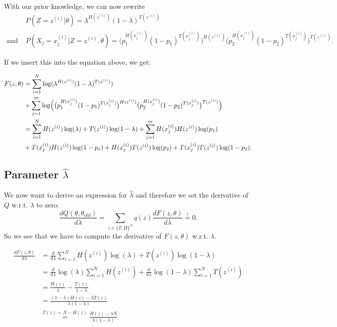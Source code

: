\documentclass[10pt,a4paper]{article}
\begin{document}
With our prior knowledge, we can now rewrite
\begin{align*}
&P(Z=z^{(i)}|\theta)=\lambda^{H(z^{(i)})}(1-\lambda)^{T(z^{(i)})}\\
\text{and } & P(X_j=x_j^{(i)}|Z=z^{(i)},\theta)= \bigl( p_1^{H(x_j^{(i)})} (1-p_1)^{T(x_j^{(i)})}\bigr)^{H(z^{(i)})} \bigl(  p_2^{H(x_j^{(i)})} (1-p_2)^{T(x_j^{(i)})} \bigr)^{T(z^{(i)})}.
\end{align*}

If we insert this into the equation above, we get:

\begin{align*}
F(z,\theta)&=\sum_{i=1}^N \log (\lambda^{H(z^{(i)})}(1-\lambda)^{T(z^{(i)})})\\
& + \sum_{j=1}^m \log \Bigl(\bigl( p_1^{H(x_j^{(i)})} (1-p_1)^{T(x_j^{(i)})}\bigr)^{H(z^{(i)})} \bigl(  p_2^{H(x_j^{(i)})} (1-p_2)^{T(x_j^{(i)})} \bigr)^{T(z^{(i)})} \Bigr)\\
&=\sum_{i=1}^N H(z^{(i)})\log (\lambda)+ T(z^{(i)}) \log (1-\lambda) +\sum_{j=1}^m  H(x_j^{(i)}) H(z^{(i)}) \log(p_1)\\
& + T(x_j^{(i)}) H(z^{(i)})\log(1-p_1) + H(x_j^{(i)})T(z^{(i)}) \log(p_2)+ T(x_j^{(i)})T(z^{(i)}) \log (1-p_2).
\end{align*}

\subsection*{Parameter $\hat \lambda$}
We now want to derive an expression for $\hat \lambda$ and therefore we set the derivative of $Q$ w.r.t. $\lambda$ to zero:
\begin{equation}\label{derQlambda}
\frac{dQ(\theta,\theta_{old})}{d\lambda}=\sum_{z\in \{T,H\}^N} q(z) \frac{dF(z,\theta)}{d\lambda} \stackrel{!}{=}0.
\end{equation}
So we see that we have to compute the derivative of $F(z,\theta)$ w.r.t. $\lambda$.

\begin{align*}
\frac{dF(z,\theta)}{d\lambda} &=\frac{d}{d\lambda}\sum_{i=1}^N H(z^{(i)})\log (\lambda)+ T(z^{(i)}) \log (1-\lambda)\\
&=\frac{d}{d\lambda}\log (\lambda)\sum_{i=1}^N H(z^{(i)})+  \frac{d}{d\lambda}\log (1-\lambda)\sum_{i=1}^N T(z^{(i)})\\
&= \frac{H(z)}{\lambda} - \frac{T(z)}{1-\lambda}\\
&=\frac{(1-\lambda)H(z)-\lambda T(z)}{\lambda(1-\lambda)}\\
& \stackrel{T(z)=N-H(z)}{=}\frac{H(z)-\lambda N}{\lambda(1-\lambda)}
\end{align*}
\end{document}
